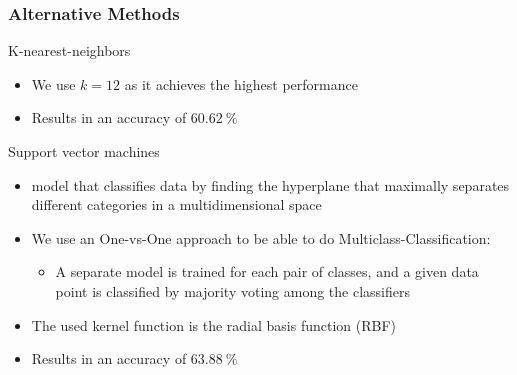 \documentclass[8pt]{beamer}
\begin{document}
\begin{frame}
\frametitle{Alternative Methods}
  \begin{alertblock}{K-nearest-neighbors}
    \begin{itemize}
     \item We use $k=12$ as it achieves the highest performance
     \item Results in an accuracy of $\SI{60.62}{\percent}$
    \end{itemize}
  \end{alertblock}
  \begin{alertblock}{Support vector machines}
    \begin{itemize}
    \item{model that classifies data by finding the hyperplane that maximally separates different categories in a multidimensional space}
    \item We use an One-vs-One approach to be able to do Multiclass-Classification:
    \begin{itemize}
      \item A separate model is trained for each pair of classes, and a given data point is classified by majority voting among the classifiers
      \end{itemize}
    \item The used kernel function is the radial basis function (RBF)
    \item Results in an accuracy of $\SI{63.88}{\percent}$
    \end{itemize}
  \end{alertblock}
\end{frame}
\end{document}
